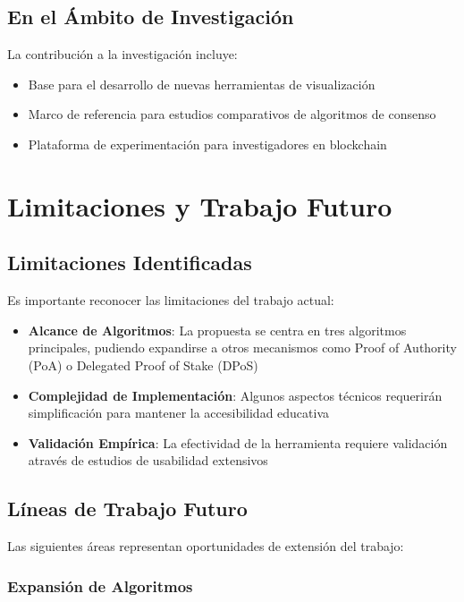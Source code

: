 \documentclass[spanish,12pt,letterpaper]{report}
\begin{document}
\subsection{En el Ámbito de Investigación}

La contribución a la investigación incluye:

\begin{itemize}
    \item Base para el desarrollo de nuevas herramientas de visualización
    \item Marco de referencia para estudios comparativos de algoritmos de consenso
    \item Plataforma de experimentación para investigadores en blockchain
\end{itemize}

\section{Limitaciones y Trabajo Futuro}

\subsection{Limitaciones Identificadas}

Es importante reconocer las limitaciones del trabajo actual:

\begin{itemize}
    \item \textbf{Alcance de Algoritmos}: La propuesta se centra en tres algoritmos principales, pudiendo expandirse a otros mecanismos como Proof of Authority (PoA) o Delegated Proof of Stake (DPoS)
    \item \textbf{Complejidad de Implementación}: Algunos aspectos técnicos requerirán simplificación para mantener la accesibilidad educativa
    \item \textbf{Validación Empírica}: La efectividad de la herramienta requiere validación através de estudios de usabilidad extensivos
\end{itemize}

\subsection{Líneas de Trabajo Futuro}

Las siguientes áreas representan oportunidades de extensión del trabajo:

\subsubsection{Expansión de Algoritmos}
\end{document}
